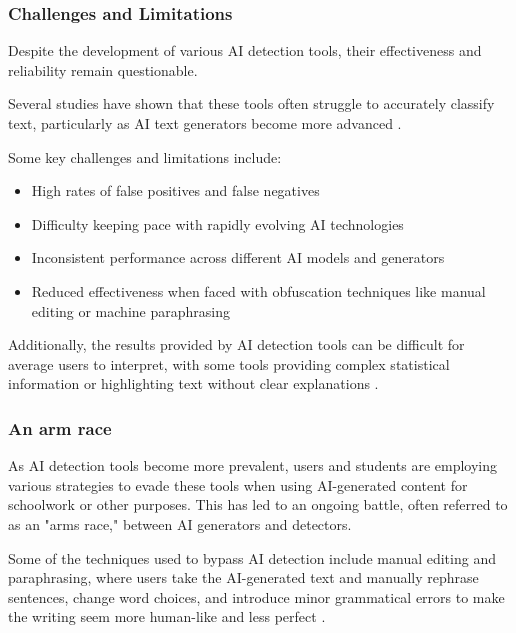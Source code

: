 \documentclass{article}
\begin{document}
\subsubsection{Challenges and Limitations}
Despite the development of various AI detection tools,
their effectiveness and reliability remain questionable.

Several studies have shown that these tools often struggle to accurately classify text,
particularly as AI text generators become more advanced
\cite{scribbr_ai_detectors}
\cite{contadu_ai_detection}
\cite{biomedcentral_ai_detection}.

Some key challenges and limitations include:
\begin{itemize}
    \item High rates of false positives and false negatives \cite{scribbr_ai_detectors} \cite{biomedcentral_ai_detection} \cite{kb_iu_chatgpt}
    \item Difficulty keeping pace with rapidly evolving AI technologies \cite{surferseo_ai_content_detectors} \cite{contadu_ai_detection}
    \item Inconsistent performance across different AI models and generators \cite{biomedcentral_ai_detection}
    \item Reduced effectiveness when faced with obfuscation techniques like manual editing or machine paraphrasing \cite{biomedcentral_ai_detection_variation}
\end{itemize}
Additionally, the results provided by AI detection tools can be difficult
for average users to interpret, with some tools providing complex statistical
information or highlighting text without clear explanations
\cite{biomedcentral_ai_detection_variation}.

\subsubsection{An arm race}
As AI detection tools become more prevalent, users and students are employing various strategies to evade
these tools when using AI-generated content for schoolwork or other purposes. This has led to an ongoing
battle, often referred to as an "arms race," between AI generators and detectors.

Some of the techniques used to bypass AI detection include manual editing and paraphrasing, where users
take the AI-generated text and manually rephrase sentences, change word choices, and introduce minor
grammatical errors to make the writing seem more human-like and less perfect \cite{reddit_avoid_ai_detection}
\cite{reddit_fool_ai_detector}.
\end{document}
